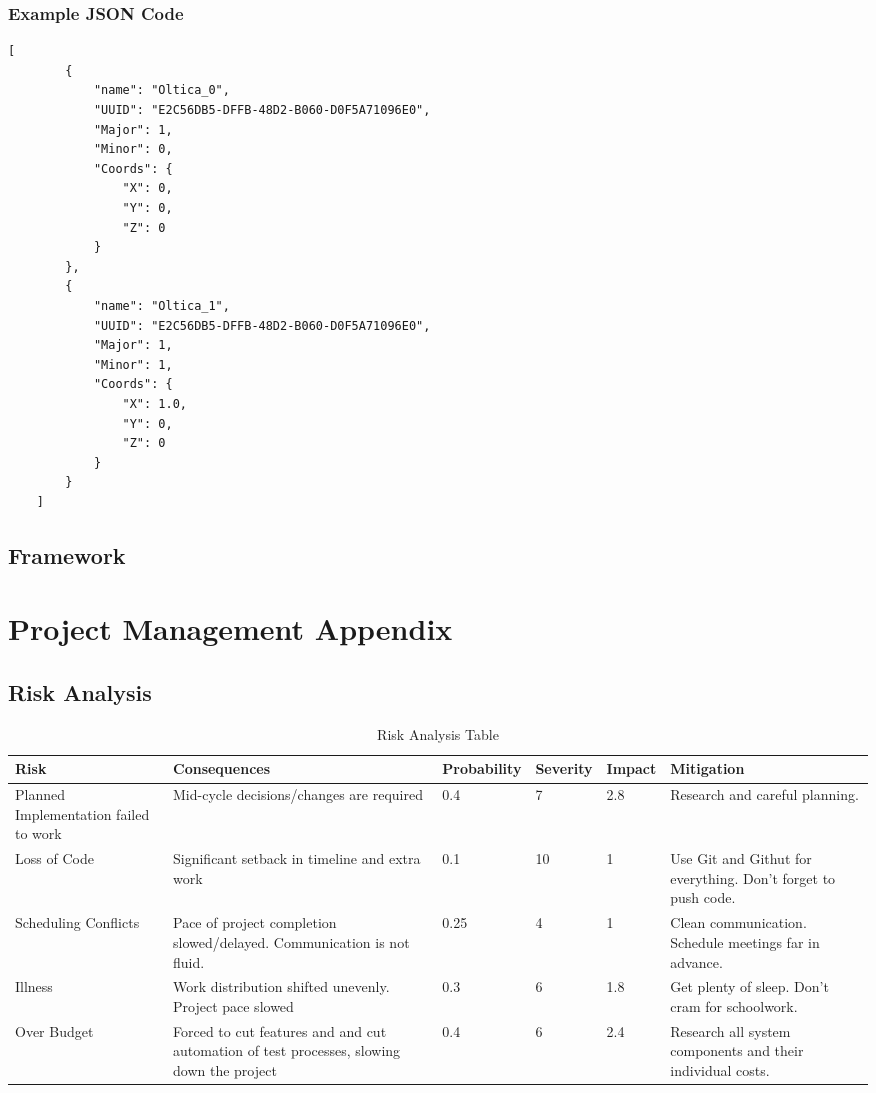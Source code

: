 \newpage
\subsection{Example JSON Code}
\begin{lstlisting}[language=XML,caption=Example JSON code generated by Admin Portal and used by Framework,captionpos=b,frame=single]
    [
        {
            "name": "Oltica_0",
            "UUID": "E2C56DB5-DFFB-48D2-B060-D0F5A71096E0",
            "Major": 1,
            "Minor": 0,
            "Coords": {
                "X": 0,
                "Y": 0,
                "Z": 0
            }
        },
        {
            "name": "Oltica_1",
            "UUID": "E2C56DB5-DFFB-48D2-B060-D0F5A71096E0",
            "Major": 1,
            "Minor": 1,
            "Coords": {
                "X": 1.0,
                "Y": 0,
                "Z": 0
            }
        }
    ]
\end{lstlisting}

\section{Framework}

\chapter{Project Management Appendix}
\section{Risk Analysis}

\begin{table}[h!]
\centering
    \begin{tabular}{ | p{2cm} | p{4cm} | l | l | l | p{3.5cm} |}\hline
    Risk & Consequences & Probability & Severity & Impact & Mitigation \\ \hline
    Planned Implementation failed to work & Mid-cycle decisions/changes are required & 0.4 & 7 & 2.8 & Research and careful planning. \\ \hline
    Loss of Code & Significant setback in timeline and extra work & 0.1 & 10 & 1 & Use Git and Githut for everything. Don't forget to push code. \\ \hline
    Scheduling Conflicts & Pace of project completion slowed/delayed.  Communication is not fluid. & 0.25 & 4 & 1 & Clean communication. Schedule meetings far in advance. \\ \hline
    Illness & Work distribution shifted unevenly. Project pace slowed & 0.3 & 6 & 1.8 & Get plenty of sleep. Don't cram for schoolwork.  \\ \hline
    Over Budget & Forced to cut features and and cut automation of test processes, slowing down the project & 0.4 & 6 & 2.4 & Research all system components and their individual costs.  \\ \hline
    \end{tabular}
    \caption{Risk Analysis Table}
\end{table}

